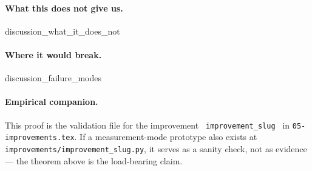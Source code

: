 \documentclass[11pt]{article}
\theoremstyle{definition}
\theoremstyle{remark}
\begin{document}
\paragraph{What this does not give us.}
{{discussion_what_it_does_not}}

\paragraph{Where it would break.}
{{discussion_failure_modes}}

\paragraph{Empirical companion.}
This proof is the validation file for the improvement \texttt{ {{improvement_slug}} } in \texttt{05-improvements.tex}. If a measurement-mode prototype also exists at \texttt{improvements/{{improvement_slug}}.py}, it serves as a sanity check, not as evidence --- the theorem above is the load-bearing claim.
\end{document}
